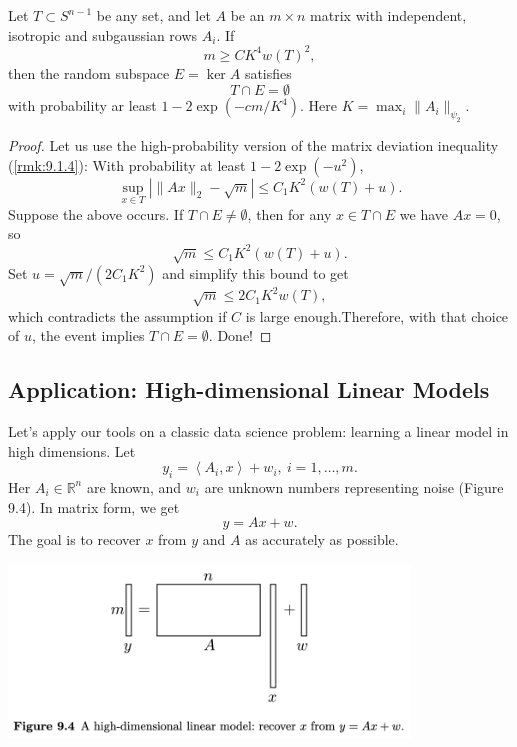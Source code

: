 \begin{theorem}
\label{thm:9.3.4}
Let $T \subset S^{n - 1}$ be any set, and let $A$ be an $m \times n$ matrix with independent, isotropic and 
subgaussian rows $A_i$. If 
\[ m \geq CK^4 w(T)^2, \]
then the random subspace $E = \ker{A}$ satisfies 
\[ T \cap E = \emptyset \]
with probability ar least $1 - 2 \exp{(-cm/K^4)}$. Here $K = \max_{i}\lVert A_i \rVert_{\psi_2}$.
\end{theorem}

\begin{proof}
Let us use the high-probability version of the matrix deviation inequality (\cref{rmk:9.1.4}): With probability 
at least $1 - 2 \exp{(-u^2)}$, 
\[ \sup_{x \in T}\left| \lVert Ax \rVert_{2} - \sqrt{m} \right| \leq C_1K^2(w(T) + u). \]
Suppose the above occurs. If $T \cap E \neq \emptyset$, then for any $x \in T \cap E$ we have $Ax = 0$, so 
\[ \sqrt{m} \leq C_1 K^2 (w(T) + u). \]
Set $u = \sqrt{m}/(2C_1K^2)$ and simplify this bound to get 
\[ \sqrt{m} \leq 2 C_1 K^2 w(T), \]
which contradicts the assumption if $C$ is large enough.Therefore, with that choice of $u$, the event implies 
$T \cap E = \emptyset$. Done!
\end{proof}


\subsection{Application: High-dimensional Linear Models}
Let's apply our tools on a classic data science problem: learning a linear model in high dimensions. Let 
\[ y_i = \left\langle A_i, x \right\rangle + w_i, \ i = 1, \dots, m. \]
Her $A_i \in \mathbb{R}^n$ are known, and $w_i$ are unknown numbers representing noise (Figure 9.4). In matrix form, we get 
\[ y = Ax + w. \]
The goal is to recover $x$ from $y$ and $A$ as accurately as possible. 

\begin{center}
	\includegraphics[width=0.8\textwidth]{Chapter 9/fig9-4.png}
\end{center}


